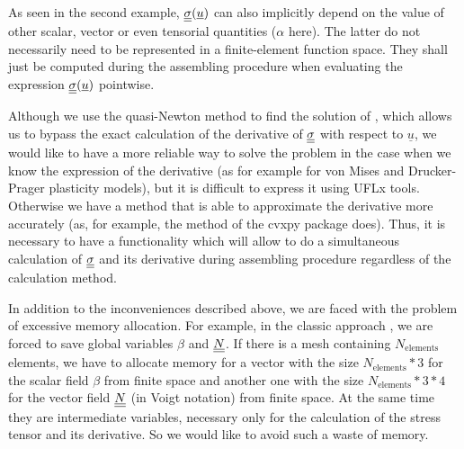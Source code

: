 \documentclass[12pt]{article}
\newcommand{\todolink}{\todo[fancyline, size=\scriptsize]{TOCITE}}
\begin{document}



As seen in the second example, $\underline{\underline{\sigma}}(\underline{u})$ can also implicitly depend on the value of other scalar, vector or even tensorial quantities ($\alpha$ here). The latter do not necessarily need to be represented in a finite-element function space. They shall just be computed during the assembling procedure when evaluating the expression $\underline{\underline{\sigma}}(\underline{u})$ pointwise.

Although we use the quasi-Newton method to find the solution of \todolink, which allows us to bypass the exact calculation of the derivative of $\underline{\underline{\sigma}}$ with respect to $\underline{u}$, we would like to have a more reliable way to solve the problem in the case when we know the expression of the derivative (as for example for von Mises and Drucker-Prager plasticity models), but it is difficult to express it using UFLx tools. Otherwise we have a method that is able to approximate the derivative more accurately (as, for example, the  method of the cvxpy package does). Thus, it is necessary to have a functionality which will allow to do a simultaneous calculation of $\underline{\underline{\sigma}}$ and its derivative during assembling procedure regardless of the calculation method.


In addition to the inconveniences described above, we are faced with the problem of excessive memory allocation. For example, in the classic approach \todolink, we are forced to save global variables $\beta$ and $\underline{\underline{N}}$. If there is a mesh containing $N_\text{elements}$ elements, we have to allocate memory for a vector with the size $N_\text{elements}*3$ for the scalar field $\beta$ from  finite space and another one with the size $N_\text{elements}*3*4$ for the vector field $\underline{\underline{N}}$ (in Voigt notation) from  finite space. At the same time they are intermediate variables, necessary only for the calculation of the stress tensor and its derivative. So we would like to avoid such a waste of memory.
\end{document}
